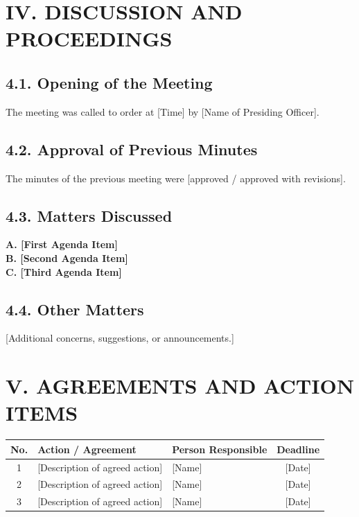 \documentclass[11pt,a4paper]{article}
\begin{document}
\section*{IV. DISCUSSION AND PROCEEDINGS}

\subsection*{4.1. Opening of the Meeting}
The meeting was called to order at [Time] by [Name of Presiding Officer].

\subsection*{4.2. Approval of Previous Minutes}
The minutes of the previous meeting were [approved / approved with revisions].

\subsection*{4.3. Matters Discussed}

\textbf{A. [First Agenda Item]}\\
[Summary of discussion and agreements reached.]

\textbf{B. [Second Agenda Item]}\\
[Summary of discussion and agreements reached.]

\textbf{C. [Third Agenda Item]}\\
[Summary of discussion and agreements reached.]

\subsection*{4.4. Other Matters}
[Additional concerns, suggestions, or announcements.]

\section*{V. AGREEMENTS AND ACTION ITEMS}

\renewcommand{\arraystretch}{1.4}
\begin{tabularx}{\textwidth}{|c|X|X|c|}
\hline
\textbf{No.} & \textbf{Action / Agreement} & \textbf{Person Responsible} & \textbf{Deadline} \\
\hline
1 & [Description of agreed action] & [Name] & [Date] \\
\hline
2 & [Description of agreed action] & [Name] & [Date] \\
\hline
3 & [Description of agreed action] & [Name] & [Date] \\
\hline
\end{tabularx}
\renewcommand{\arraystretch}{1}
\end{document}
